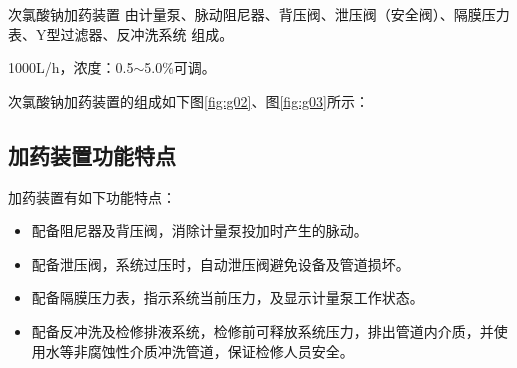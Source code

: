 
次氯酸钠加药装置
由计量泵、脉动阻尼器、背压阀、泄压阀（安全阀）、隔膜压力表、Y型过滤器、反冲洗系统
组成。

1000L/h，浓度：0.5$\sim$5.0\%可调。
  
次氯酸钠加药装置的组成如下图\ref{fig:g02}、图\ref{fig:g03}所示：\\



\newpage



\subsection{加药装置功能特点}
    加药装置有如下功能特点：
    \begin{itemize}
         \item 配备阻尼器及背压阀，消除计量泵投加时产生的脉动。
         \item 配备泄压阀，系统过压时，自动泄压阀避免设备及管道损坏。
         \item 配备隔膜压力表，指示系统当前压力，及显示计量泵工作状态。
         \item 配备反冲洗及检修排液系统，检修前可释放系统压力，排出管道内介质，并使用水等非腐蚀性介质冲洗管道，保证检修人员安全。
    \end{itemize}



